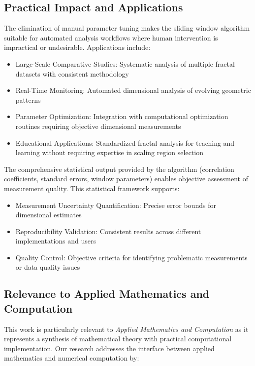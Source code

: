 \documentclass[preprint,12pt]{elsarticle}
\def\textbf#1{#1}%
\begin{document}
\subsection{Practical Impact and Applications}

The elimination of manual parameter tuning makes the sliding window algorithm suitable for automated analysis workflows where human intervention is impractical or undesirable. Applications include:

\begin{itemize}
\item \textbf{Large-Scale Comparative Studies}: Systematic analysis of multiple fractal datasets with consistent methodology
\item \textbf{Real-Time Monitoring}: Automated dimensional analysis of evolving geometric patterns
\item \textbf{Parameter Optimization}: Integration with computational optimization routines requiring objective dimensional measurements
\item \textbf{Educational Applications}: Standardized fractal analysis for teaching and learning without requiring expertise in scaling region selection
\end{itemize}

The comprehensive statistical output provided by the algorithm (correlation coefficients, standard errors, window parameters) enables objective assessment of measurement quality. This statistical framework supports:

\begin{itemize}
\item \textbf{Measurement Uncertainty Quantification}: Precise error bounds for dimensional estimates
\item \textbf{Reproducibility Validation}: Consistent results across different implementations and users
\item \textbf{Quality Control}: Objective criteria for identifying problematic measurements or data quality issues
\end{itemize}

\subsection{Relevance to Applied Mathematics and Computation}

This work is particularly relevant to \emph{Applied Mathematics and Computation} as it represents a synthesis of mathematical theory with practical computational implementation. Our research addresses the interface between applied mathematics and numerical computation by:
\end{document}
